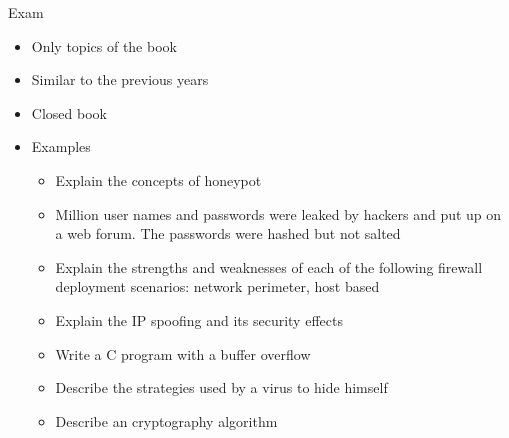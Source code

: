 \documentclass{beamer}
\begin{document}
\begin{frame}{Exam}
  \begin{itemize}
  \item Only topics of the book
  \item Similar to the previous years
  \item Closed book
  \item Examples
    \begin{itemize}
      \item Explain the concepts of honeypot
      \item Million user names and passwords were leaked
        by hackers and put up on a web forum.
        The passwords were hashed but not salted
      \item Explain the strengths and weaknesses of each of the
        following ﬁrewall deployment scenarios: network perimeter,
        host based
      \item Explain the IP spoofing and its security effects
      \item Write a C program with a buffer overflow
      \item Describe the strategies used by a virus to hide himself
      \item Describe an cryptography algorithm
    \end{itemize}
  \end{itemize}
\end{frame}

\end{document}
